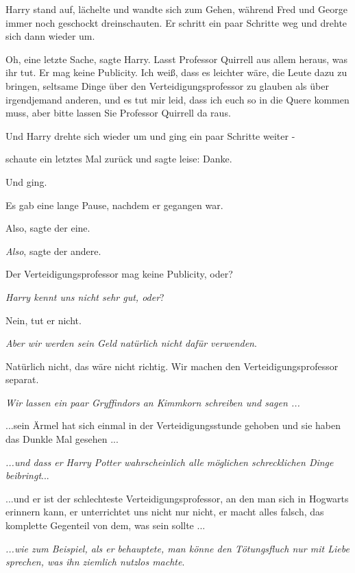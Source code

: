 Harry stand auf, lächelte und wandte sich zum Gehen, während Fred und George
immer noch geschockt dreinschauten. Er schritt ein paar Schritte weg und drehte
sich dann wieder um.

\glqq{}Oh, eine letzte Sache\grqq{}, sagte Harry. \glqq{}Lasst Professor
Quirrell aus allem heraus, was ihr tut. Er mag keine Publicity. Ich weiß, dass
es leichter wäre, die Leute dazu zu bringen, seltsame Dinge über den
Verteidigungsprofessor zu glauben als über irgendjemand anderen, und es tut mir
leid, dass ich euch so in die Quere kommen muss, aber bitte lassen Sie Professor
Quirrell da raus.\grqq{}

Und Harry drehte sich wieder um und ging ein paar Schritte weiter -

schaute ein letztes Mal zurück und sagte leise: \glqq{}Danke.\grqq{}

Und ging.

Es gab eine lange Pause, nachdem er gegangen war.

\glqq{}Also\grqq{}, sagte der eine.

\glqq{}\emph{Also}\grqq{}, sagte der andere.

\glqq{}Der Verteidigungsprofessor mag keine Publicity, oder?\grqq{}

\glqq{}\emph{Harry kennt uns nicht sehr gut, oder}?\grqq{}

\glqq{}Nein, tut er nicht.\grqq{}

\glqq{} \emph{Aber wir werden sein Geld natürlich nicht dafür verwenden}.\grqq{}

\glqq{} Natürlich nicht, das wäre nicht richtig. Wir machen den
Verteidigungsprofessor separat.\grqq{}

\glqq{}\emph{Wir lassen ein paar Gryffindors an Kimmkorn schreiben und
sagen ...}\grqq{}

\glqq{}...sein Ärmel hat sich einmal in der Verteidigungsstunde gehoben und sie
haben das Dunkle Mal gesehen ...\grqq{}

\glqq{}\emph{...und dass er Harry Potter wahrscheinlich alle möglichen
schrecklichen Dinge} \emph{beibringt}...\grqq{}

\glqq{}...und er ist der schlechteste Verteidigungsprofessor, an den man sich in
Hogwarts erinnern kann, er unterrichtet uns nicht nur nicht, er macht alles
falsch, das komplette Gegenteil von dem, was sein sollte ...\grqq{}

\glqq{}\emph{...wie zum Beispiel, als er behauptete, man könne den Tötungsfluch
nur mit Liebe sprechen, was ihn ziemlich nutzlos machte}.\grqq{}

